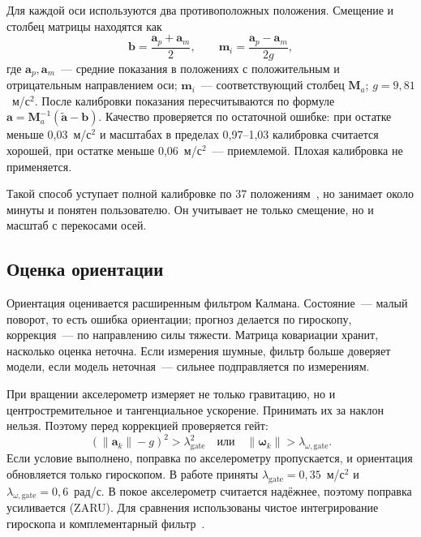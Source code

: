 \documentclass{misisarticle}
\begin{document}
Для каждой оси используются два противоположных положения. Смещение и столбец матрицы находятся как
\begin{equation}
\mathbf b=\frac{\mathbf a_p+\mathbf a_m}{2},\qquad
\mathbf m_i=\frac{\mathbf a_p-\mathbf a_m}{2g},
\label{eq:calib}
\end{equation}
где $\mathbf a_p,\mathbf a_m$~--- средние показания в положениях с положительным и отрицательным направлением оси; $\mathbf m_i$~--- соответствующий столбец $\mathbf M_a$; $g=9{,}81$~м/с$^2$. После калибровки показания пересчитываются по формуле $\mathbf a=\mathbf M_a^{-1}(\tilde{\mathbf a}-\mathbf b)$. Качество проверяется по остаточной ошибке: при остатке меньше 0,03~м/с$^2$ и масштабах в пределах 0,97--1,03 калибровка считается хорошей, при остатке меньше 0,06~м/с$^2$~--- приемлемой. Плохая калибровка не применяется.

Такой способ уступает полной калибровке по 37 положениям~\cite{tedaldi}, но занимает около минуты и понятен пользователю. Он учитывает не только смещение, но и масштаб с перекосами осей.

\subsection{Оценка ориентации}

Ориентация оценивается расширенным фильтром Калмана. Состояние~--- малый поворот, то есть ошибка ориентации; прогноз делается по гироскопу, коррекция~--- по направлению силы тяжести. Матрица ковариации хранит, насколько оценка неточна. Если измерения шумные, фильтр больше доверяет модели, если модель неточная~--- сильнее подправляется по измерениям.

При вращении акселерометр измеряет не только гравитацию, но и центростремительное и тангенциальное ускорение. Принимать их за наклон нельзя. Поэтому перед коррекцией проверяется гейт:
\begin{equation}
\left(\|\mathbf a_k\|-g\right)^2>\lambda_{\text{gate}}^2
\quad\text{или}\quad
\|\boldsymbol\omega_k\|>\lambda_{\omega,\text{gate}}.
\label{eq:gate}
\end{equation}
Если условие выполнено, поправка по акселерометру пропускается, и ориентация обновляется только гироскопом. В работе приняты $\lambda_{\text{gate}}=0{,}35$~м/с$^2$ и $\lambda_{\omega,\text{gate}}=0{,}6$~рад/с. В покое акселерометр считается надёжнее, поэтому поправка усиливается (ZARU). Для сравнения использованы чистое интегрирование гироскопа и комплементарный фильтр~\cite{mahony}.
\end{document}
